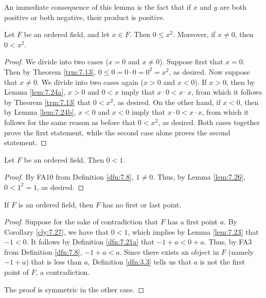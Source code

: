 \documentclass[../main.tex]{subfiles}
\begin{document}
\begin{remark}\label{rmk:7.25}
    An immediate consequence of this lemma is the fact that if $x$ and $y$ are both positive or both negative, their product is positive.
\end{remark}

\begin{lemma}\label{lem:7.26}
    Let $F$ be an ordered field, and let $x\in F$. Then $0\leq x^2$. Moreover, if $x\neq 0$, then $0<x^2$.
    \begin{proof}
        We divide into two cases ($x=0$ and $x\neq 0$). Suppose first that $x=0$. Then by Theorem \ref{trm:7.13}, $0\leq 0=0\cdot 0=0^2=x^2$, as desired. Now suppose that $x\neq 0$. We divide into two cases again ($x>0$ and $x<0$). If $x>0$, then by Lemma \ref{lem:7.24a}, $x>0$ and $0<x$ imply that $x\cdot 0<x\cdot x$, from which it follows by Theorem \ref{trm:7.13} that $0<x^2$, as desired. On the other hand, if $x<0$, then by Lemma \ref{lem:7.24b}, $x<0$ and $x<0$ imply that $x\cdot 0<x\cdot x$, from which it follows for the same reason as before that $0<x^2$, as desired. Both cases together prove the first statement, while the second case alone proves the second statement.
    \end{proof}
\end{lemma}

\begin{corollary}\label{cly:7.27}
    Let $F$ be an ordered field. Then $0<1$.
    \begin{proof}
        By FA10 from Definition \ref{dfn:7.8}, $1\neq 0$. Thus, by Lemma \ref{lem:7.26}, $0<1^2=1$, as desired.
    \end{proof}
\end{corollary}

\begin{theorem}\label{trm:7.28}
    If $F$ is an ordered field, then $F$ has no first or last point.
    \begin{proof}
        Suppose for the sake of contradiction that $F$ has a first point $a$. By Corollary \ref{cly:7.27}, we have that $0<1$, which implies by Lemma \ref{lem:7.23} that $-1<0$. It follows by Definition \ref{dfn:7.21a} that $-1+a<0+a$. Thus, by FA3 from Definition \ref{dfn:7.8}, $-1+a<a$. Since there exists an object in $F$ (namely $-1+a$) that is less than $a$, Definition \ref{dfn:3.3} tells us that $a$ is not the first point of $F$, a contradiction.\par
        The proof is symmetric in the other case.
    \end{proof}
\end{theorem}
\pagebreak
\end{document}

